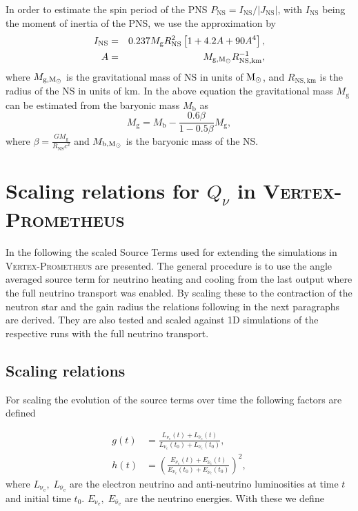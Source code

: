 \documentclass[fleqn,usenatbib]{mnras}
\newcommand{\solm}{\ensuremath{\rm{M_{\odot}}}\xspace}
\newcommand{\km}{\ensuremath{\mathrm{km}}}
\newcommand{\vertexprom}{\textsc{Vertex-Prometheus}\xspace}
\begin{document}
In order to estimate the spin period of the PNS $P_{\mathrm{NS}}=I_{\mathrm{NS}}/|J_{\mathrm{NS}}|$, with $I_{\mathrm{NS}}$ being the moment of inertia of the PNS, we use the approximation by \citet{Lattimer2004}
\begin{eqnarray}
    I_{\mathrm{NS}} &=& 0.237M_{\mathrm{g}}R_{\text{NS}}^2\left[1 + 4.2 A  + 90 A^4\right],\\
    A &=&  M_{\text{g},\solm}R_{\text{NS},\km}^{-1},\nonumber
    \label{equ: ins}
\end{eqnarray}
where $M_{\text{g},\solm}$ is the gravitational mass of NS in units of $\solm$, and $R_{\text{NS},\km}$ is the radius of the NS in units of $\km$.
In the above equation the gravitational mass $M_{\mathrm{g}}$ can be estimated from the baryonic mass $M_{\mathrm{b}}$  as \citep{Lattimer2000}
\begin{equation}
    M_{\mathrm{g}} = M_{\mathrm{b}} - \frac{0.6 \beta}{1-0.5\beta}  M_{\mathrm{g}}, 
\end{equation}
where $\beta=\frac{GM_{\mathrm{g}}}{R_{\mathrm{NS}}c^2}$ and
$M_{\text{b},\solm}$ is the baryonic mass of the NS.

\section{Scaling relations for $Q_{\nu}$ in \vertexprom}
\label{appendix:scaling relations}

In the following the scaled Source Terms used for extending the simulations in \vertexprom are presented. The general procedure is to use the angle averaged source term for neutrino heating and cooling from the last output where the full neutrino transport was enabled. By scaling these to the contraction of the neutron star and the gain radius the relations following in the next paragraphs are derived. They are also tested and scaled against 1D simulations of the respective runs with the full neutrino transport.
\subsection{Scaling relations}
For scaling the evolution of the source terms over time the following factors are defined

\begin{align}
    g(t) &= \frac{L_{\nu_e}(t) +          L_{\bar{\nu}_e}(t)}{L_{\nu_e}(t_0) +
    L_{\bar{\nu}_e}(t_0)}, \\
    h(t) &= \left(\frac{E_{\nu_e}(t) + E_{\bar{\nu}_e}(t)}{E_{\nu_e}(t_0) +
    E_{\bar{\nu}_e}(t_0)}\right)^2,
\end{align}
where $L_{\mathrm{\nu_e}}, \;L_{\mathrm{\bar{\nu}_e}}$ are the electron neutrino and anti-neutrino luminosities at time $t$ and initial time $t_0$. $E_{\mathrm{\nu_e}}, \;E_{\mathrm{\bar{\nu}_e}}$ are the neutrino energies. With these we define
\end{document}
